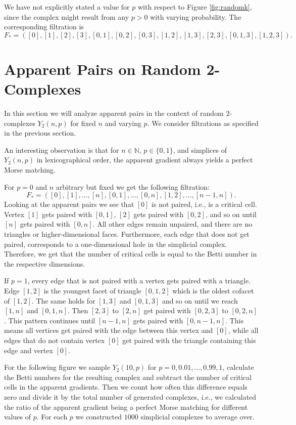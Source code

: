 We have not explicitly stated a value for $p$ with respect to Figure \ref{fig:randomk}, since the complex might result from any $p > 0$ with varying probability. The corresponding filtration is \[
F_* = ([0],[1],[2],[3],[0,1],[0,2],[0,3],[1,2],[1,3],[2,3],[0,1,3],[1,2,3]).
\]


\section{Apparent Pairs on Random 2-Complexes}
In this section we will analyze apparent pairs in the context of random $2$-complexes $Y_2(n,p)$ for fixed $n$ and varying $p$. We consider filtrations as specified in the previous section.

An interesting observation is that for $n\in \mathbb{N}$, $p \in \{0,1\}$, and simplices of $Y_2(n,p)$ in lexicographical order, the apparent gradient always yields a perfect Morse matching. 

For $p = 0$ and $n$ arbitrary but fixed we get the following filtration: 
\[
F_* = ([0],[1],\dots,[n],[0,1],\dots,[0,n],[1,2],\dots,[n-1,n]).
\]
Looking at the apparent pairs we see that $[0]$ is not paired, i.e., is a critical cell. Vertex $[1]$ gets paired with $[0,1]$, $[2]$ gets paired with $[0,2]$, and so on until $[n]$ gets paired with $[0,n]$. All other edges remain unpaired, and there are no triangles or higher-dimensional faces. Furthermore, each edge that does not get paired, corresponds to a one-dimensional hole in the simplicial complex. Therefore, we get that the number of critical cells is equal to the Betti number in the respective dimensions. 

If $p = 1$, every edge that is not paired with a vertex gets paired with a triangle. Edge $[1,2]$ is the youngest facet of triangle $[0,1,2]$ which is the oldest cofacet of $[1,2]$. The same holds for $[1,3]$ and $[0,1,3]$ and so on until we reach $[1,n]$ and $[0,1,n]$. Then $[2,3]$ to $[2,n]$ get paired with $[0,2,3]$ to $[0,2,n]$. This pattern continues until $[n-1,n]$ gets paired with $[0,n-1,n]$. This means all vertices get paired with the edge between this vertex and $[0]$, while all edges that do not contain vertex $[0]$ get paired with the triangle containing this edge and vertex $[0]$.

For the following figure we sample $Y_2(10,p)$ for $p = 0,0.01,\dots,0.99,1$, calculate the Betti numbers for the resulting complex and subtract the number of critical cells in the apparent gradients. Then we count how often this difference equals zero and divide it by the total number of generated complexes, i.e., we calculated the ratio of the apparent gradient being a perfect Morse matching for different values of $p$. For each $p$ we constructed $1000$ simplicial complexes to average over.

